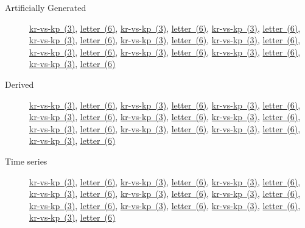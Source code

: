 \documentclass[twoside,11pt]{article}
\begin{document}
\begin{description}
	\item[Artificially Generated] \href{https://www.openml.org/d/3}{kr-vs-kp~(3)}, \href{https://www.openml.org/d/6}{letter~(6)}, \href{https://www.openml.org/d/3}{kr-vs-kp~(3)}, \href{https://www.openml.org/d/6}{letter~(6)}, \href{https://www.openml.org/d/3}{kr-vs-kp~(3)}, \href{https://www.openml.org/d/6}{letter~(6)}, \href{https://www.openml.org/d/3}{kr-vs-kp~(3)}, \href{https://www.openml.org/d/6}{letter~(6)}, \href{https://www.openml.org/d/3}{kr-vs-kp~(3)}, \href{https://www.openml.org/d/6}{letter~(6)}, \href{https://www.openml.org/d/3}{kr-vs-kp~(3)}, \href{https://www.openml.org/d/6}{letter~(6)}, \href{https://www.openml.org/d/3}{kr-vs-kp~(3)}, \href{https://www.openml.org/d/6}{letter~(6)}, \href{https://www.openml.org/d/3}{kr-vs-kp~(3)}, \href{https://www.openml.org/d/6}{letter~(6)}, \href{https://www.openml.org/d/3}{kr-vs-kp~(3)}, \href{https://www.openml.org/d/6}{letter~(6)}, \href{https://www.openml.org/d/3}{kr-vs-kp~(3)}, \href{https://www.openml.org/d/6}{letter~(6)}
	\item[Derived] \href{https://www.openml.org/d/3}{kr-vs-kp~(3)}, \href{https://www.openml.org/d/6}{letter~(6)}, \href{https://www.openml.org/d/3}{kr-vs-kp~(3)}, \href{https://www.openml.org/d/6}{letter~(6)}, \href{https://www.openml.org/d/3}{kr-vs-kp~(3)}, \href{https://www.openml.org/d/6}{letter~(6)}, \href{https://www.openml.org/d/3}{kr-vs-kp~(3)}, \href{https://www.openml.org/d/6}{letter~(6)}, \href{https://www.openml.org/d/3}{kr-vs-kp~(3)}, \href{https://www.openml.org/d/6}{letter~(6)}, \href{https://www.openml.org/d/3}{kr-vs-kp~(3)}, \href{https://www.openml.org/d/6}{letter~(6)}, \href{https://www.openml.org/d/3}{kr-vs-kp~(3)}, \href{https://www.openml.org/d/6}{letter~(6)}, \href{https://www.openml.org/d/3}{kr-vs-kp~(3)}, \href{https://www.openml.org/d/6}{letter~(6)}, \href{https://www.openml.org/d/3}{kr-vs-kp~(3)}, \href{https://www.openml.org/d/6}{letter~(6)}, \href{https://www.openml.org/d/3}{kr-vs-kp~(3)}, \href{https://www.openml.org/d/6}{letter~(6)}
	\item[Time series] \href{https://www.openml.org/d/3}{kr-vs-kp~(3)}, \href{https://www.openml.org/d/6}{letter~(6)}, \href{https://www.openml.org/d/3}{kr-vs-kp~(3)}, \href{https://www.openml.org/d/6}{letter~(6)}, \href{https://www.openml.org/d/3}{kr-vs-kp~(3)}, \href{https://www.openml.org/d/6}{letter~(6)}, \href{https://www.openml.org/d/3}{kr-vs-kp~(3)}, \href{https://www.openml.org/d/6}{letter~(6)}, \href{https://www.openml.org/d/3}{kr-vs-kp~(3)}, \href{https://www.openml.org/d/6}{letter~(6)}, \href{https://www.openml.org/d/3}{kr-vs-kp~(3)}, \href{https://www.openml.org/d/6}{letter~(6)}, \href{https://www.openml.org/d/3}{kr-vs-kp~(3)}, \href{https://www.openml.org/d/6}{letter~(6)}, \href{https://www.openml.org/d/3}{kr-vs-kp~(3)}, \href{https://www.openml.org/d/6}{letter~(6)}, \href{https://www.openml.org/d/3}{kr-vs-kp~(3)}, \href{https://www.openml.org/d/6}{letter~(6)}, \href{https://www.openml.org/d/3}{kr-vs-kp~(3)}, \href{https://www.openml.org/d/6}{letter~(6)}
\end{description}
\end{document}
